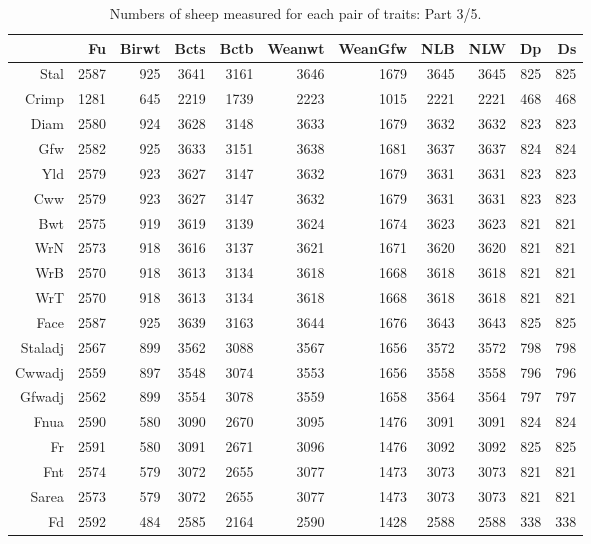 \begin{table}[p]
\footnotesize
\centering
\caption{Numbers of sheep measured for each pair of traits: Part 3/5.} 
\label{tab:counts3}
\begin{tabular}{rrrrrrrrrrr}
  \hline
 & Fu & Birwt & Bcts & Bctb & Weanwt & WeanGfw & NLB & NLW & Dp & Ds \\ 
  \hline
Stal & 2587 & 925 & 3641 & 3161 & 3646 & 1679 & 3645 & 3645 & 825 & 825 \\ 
  Crimp & 1281 & 645 & 2219 & 1739 & 2223 & 1015 & 2221 & 2221 & 468 & 468 \\ 
  Diam & 2580 & 924 & 3628 & 3148 & 3633 & 1679 & 3632 & 3632 & 823 & 823 \\ 
  Gfw & 2582 & 925 & 3633 & 3151 & 3638 & 1681 & 3637 & 3637 & 824 & 824 \\ 
  Yld & 2579 & 923 & 3627 & 3147 & 3632 & 1679 & 3631 & 3631 & 823 & 823 \\ 
  Cww & 2579 & 923 & 3627 & 3147 & 3632 & 1679 & 3631 & 3631 & 823 & 823 \\ 
  Bwt & 2575 & 919 & 3619 & 3139 & 3624 & 1674 & 3623 & 3623 & 821 & 821 \\ 
  WrN & 2573 & 918 & 3616 & 3137 & 3621 & 1671 & 3620 & 3620 & 821 & 821 \\ 
  WrB & 2570 & 918 & 3613 & 3134 & 3618 & 1668 & 3618 & 3618 & 821 & 821 \\ 
  WrT & 2570 & 918 & 3613 & 3134 & 3618 & 1668 & 3618 & 3618 & 821 & 821 \\ 
  Face & 2587 & 925 & 3639 & 3163 & 3644 & 1676 & 3643 & 3643 & 825 & 825 \\ 
  Staladj & 2567 & 899 & 3562 & 3088 & 3567 & 1656 & 3572 & 3572 & 798 & 798 \\ 
  Cwwadj & 2559 & 897 & 3548 & 3074 & 3553 & 1656 & 3558 & 3558 & 796 & 796 \\ 
  Gfwadj & 2562 & 899 & 3554 & 3078 & 3559 & 1658 & 3564 & 3564 & 797 & 797 \\ 
  Fnua & 2590 & 580 & 3090 & 2670 & 3095 & 1476 & 3091 & 3091 & 824 & 824 \\ 
  Fr & 2591 & 580 & 3091 & 2671 & 3096 & 1476 & 3092 & 3092 & 825 & 825 \\ 
  Fnt & 2574 & 579 & 3072 & 2655 & 3077 & 1473 & 3073 & 3073 & 821 & 821 \\ 
  Sarea & 2573 & 579 & 3072 & 2655 & 3077 & 1473 & 3073 & 3073 & 821 & 821 \\ 
  Fd & 2592 & 484 & 2585 & 2164 & 2590 & 1428 & 2588 & 2588 & 338 & 338 \\ 

\end{tabular}
\end{table}
